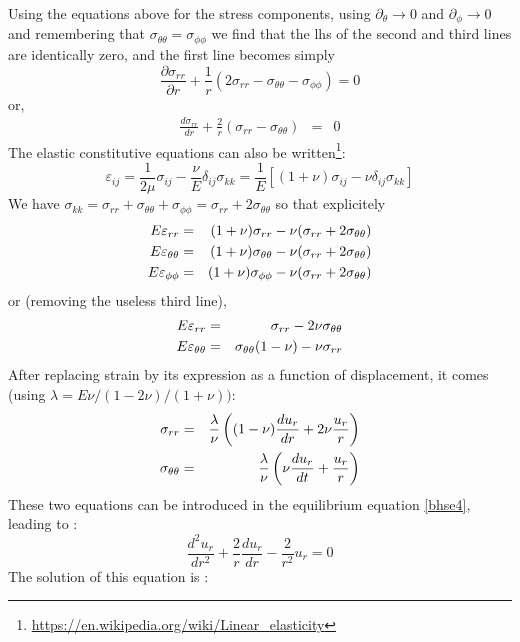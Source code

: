 Using the equations above for the stress components, 
using $\partial_\theta \rightarrow 0$ and $\partial_\phi \rightarrow 0$
and remembering that $\sigma_{\theta\theta}=\sigma_{\phi\phi}$
we find that the lhs of the second and third lines are identically zero,
and the first line becomes simply
\[
\frac{\partial \sigma_{rr}}{\partial r} + 
\frac{1}{r} (2\sigma_{rr} -\sigma_{\theta\theta} -\sigma_{\phi\phi} ) = 0 
\]
or, 
\begin{eqnarray}
\frac{d\sigma_{rr}}{dr} + \frac{2}{r}(\sigma_{rr}-\sigma_{\theta\theta})&=&0 \label{bhse4}
\end{eqnarray}
The elastic constitutive equations can also be written\footnote{\url{
https://en.wikipedia.org/wiki/Linear_elasticity}}:
\[
\varepsilon_{ij} 
= \frac{1}{2\mu} \sigma_{ij}  - \frac{\nu}{E} \delta_{ij} \sigma_{kk}
= \frac{1}{E} \left[ (1+\nu)\sigma_{ij} -\nu\delta_{ij}\sigma_{kk}  \right]
\]
We have $\sigma_{kk} 
= \sigma_{rr} + \sigma_{\theta\theta} + \sigma_{\phi\phi}  
= \sigma_{rr} + 2\sigma_{\theta\theta} $ so that explicitely 
\begin{eqnarray}
E \varepsilon_{rr} &=&    (1+\nu)\sigma_{rr} -\nu ( \sigma_{rr} + 2\sigma_{\theta\theta}    )\nonumber \\
E \varepsilon_{\theta\theta} &=&    (1+\nu)\sigma_{\theta\theta} -\nu( \sigma_{rr} + 2\sigma_{\theta\theta}) \nonumber\\
E \varepsilon_{\phi\phi} &=&   (1+\nu)\sigma_{\phi\phi} -\nu( \sigma_{rr} + 2\sigma_{\theta\theta}    ) \nonumber
\end{eqnarray}
or (removing the useless third line),
\begin{eqnarray}
E \varepsilon_{rr} &=& \sigma_{rr}-2 \nu \sigma_{\theta\theta} \nonumber\\
E \varepsilon_{\theta\theta} &=& \sigma_{\theta\theta} (1-\nu) - \nu \sigma_{rr}
\end{eqnarray}
After replacing strain by its expression as a function of displacement, 
it comes (using $\lambda = E \nu /(1-2\nu)/(1+\nu) )$:
\begin{eqnarray}
\sigma_{rr} &=& \frac{\lambda}{\nu}
\left((1-\nu)\frac{du_r}{dr} + 2\nu \frac{u_r}{r}\right) \nonumber\\
\sigma_{\theta\theta} &=& \frac{\lambda}{\nu}
\left(\nu \frac{du_r}{dt} + \frac{u_r}{r}\right)
\end{eqnarray}
These two equations can be introduced in the equilibrium equation \eqref{bhse4}, leading to :
\[
\frac{d^2 u_r}{dr^2} + \frac{2}{r} \frac{du_r}{dr} -\frac{2}{r^2}u_r = 0
\]
The solution of this equation is :
